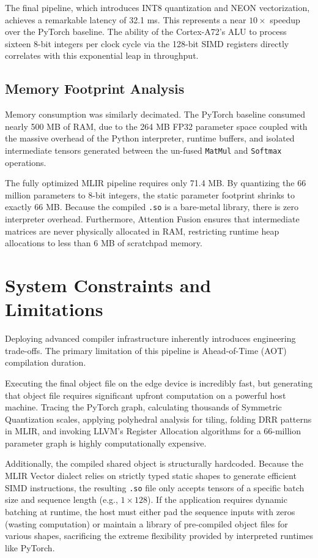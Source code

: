 The final pipeline, which introduces INT8 quantization and NEON vectorization, achieves a remarkable latency of 32.1 ms. This represents a near $10\times$ speedup over the PyTorch baseline. The ability of the Cortex-A72's ALU to process sixteen 8-bit integers per clock cycle via the 128-bit SIMD registers directly correlates with this exponential leap in throughput.

\subsection{Memory Footprint Analysis}
Memory consumption was similarly decimated. The PyTorch baseline consumed nearly 500 MB of RAM, due to the 264 MB FP32 parameter space coupled with the massive overhead of the Python interpreter, runtime buffers, and isolated intermediate tensors generated between the un-fused \texttt{MatMul} and \texttt{Softmax} operations.

The fully optimized MLIR pipeline requires only 71.4 MB. By quantizing the 66 million parameters to 8-bit integers, the static parameter footprint shrinks to exactly 66 MB. Because the compiled \texttt{.so} is a bare-metal library, there is zero interpreter overhead. Furthermore, Attention Fusion ensures that intermediate matrices are never physically allocated in RAM, restricting runtime heap allocations to less than 6 MB of scratchpad memory.

\section{System Constraints and Limitations}
Deploying advanced compiler infrastructure inherently introduces engineering trade-offs. The primary limitation of this pipeline is Ahead-of-Time (AOT) compilation duration. 

Executing the final object file on the edge device is incredibly fast, but generating that object file requires significant upfront computation on a powerful host machine. Tracing the PyTorch graph, calculating thousands of Symmetric Quantization scales, applying polyhedral analysis for tiling, folding DRR patterns in MLIR, and invoking LLVM's Register Allocation algorithms for a 66-million parameter graph is highly computationally expensive.

Additionally, the compiled shared object is structurally hardcoded. Because the MLIR Vector dialect relies on strictly typed static shapes to generate efficient SIMD instructions, the resulting \texttt{.so} file only accepts tensors of a specific batch size and sequence length (e.g., $1 \times 128$). If the application requires dynamic batching at runtime, the host must either pad the sequence inputs with zeros (wasting computation) or maintain a library of pre-compiled object files for various shapes, sacrificing the extreme flexibility provided by interpreted runtimes like PyTorch.
